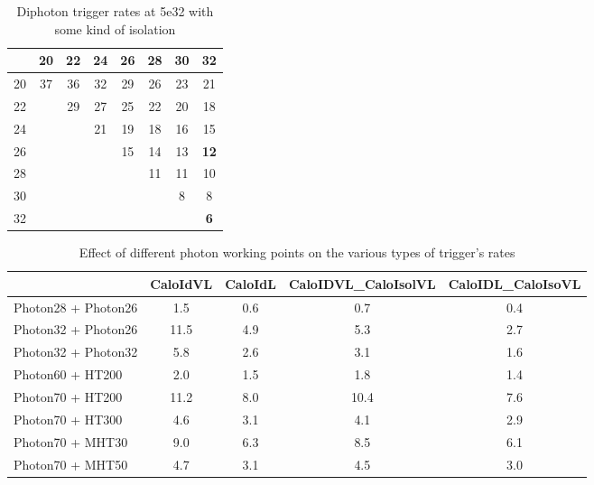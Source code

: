 \begin{table}
\begin{center}
\begin{tabular}{|l|ccccccc|}\hline
    & 20 & 22 & 24 & 26 & 28 & 30 & 32 \\ \hline \hline
20 & 37 & 36 & 32 & 29 & 26 & 23 & 21 \\
22 &    & 29 & 27 & 25 & 22 & 20 & 18 \\
24 &    &    & 21 & 19 & 18 & 16 & 15 \\
26 &    &    &    & 15 & 14 & 13 & \bf{12} \\
28 &    &    &    &    & 11 & 11 & 10 \\
30 &    &    &    &    &    & 8  & 8  \\
32 &    &    &    &    &    &    & \bf{6}  \\
\end{tabular}
\end{center}
\caption{Diphoton trigger rates at 5e32 with some kind of isolation}
\end{table}



\begin{table}
\begin{center}
\begin{tabular}{|l|cccc|}\hline
                                & CaloIdVL & CaloIdL & CaloIDVL\_CaloIsolVL & CaloIDL\_CaloIsoVL \\ \hline
Photon28 + Photon26             &      1.5              &        0.6              &       0.7          &  0.4 \\
Photon32 + Photon26             &      11.5              &       4.9               &      5.3          &  2.7 \\         
Photon32 + Photon32             &      5.8              &        2.6              &       3.1         &  1.6 \\
Photon60 + HT200                &      2.0              &       1.5               &       1.8         &  1.4 \\
Photon70 + HT200                &      11.2              &       8.0               &      10.4        &  7.6   \\
Photon70 + HT300                &      4.6              &        3.1              &       4.1         & 2.9  \\
Photon70 + MHT30                &      9.0              &       6.3               &      8.5          & 6.1  \\
Photon70 + MHT50                &      4.7              &       3.1               &      4.5          & 3.0  \\ \hline
\end{tabular}
\end{center}
\caption{Effect of different photon working points on the various types of trigger's rates}
\end{table}

